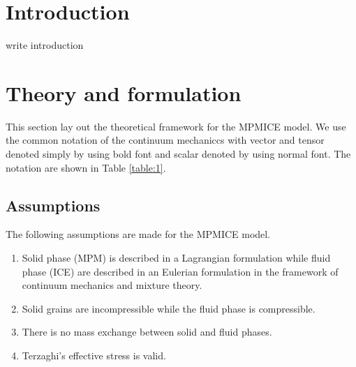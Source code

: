 \documentclass[preprint,12pt]{elsarticle}
\begin{document}
\newpage
%
\section{\textsf{Introduction}}
write introduction
\section{\textsf{Theory and formulation}}
This section lay out the theoretical framework for the MPMICE model. We use the common notation of the continuum mechaniccs with vector and tensor denoted simply by using bold font and scalar denoted by using normal font. The notation
are shown in Table \ref{table:1}.
\subsection{\textsf{Assumptions}}
The following assumptions are made for the MPMICE model.
\begin{enumerate}
\item Solid phase (MPM) is described in a Lagrangian formulation while fluid phase (ICE) are described in an Eulerian formulation in the framework of continuum mechanics and mixture theory.
\item Solid grains are incompressible while the fluid phase is compressible.
\item There is no mass exchange between solid and fluid phases.
\item Terzaghi's effective stress is valid. 
\end{enumerate}
%
%
\end{document}
